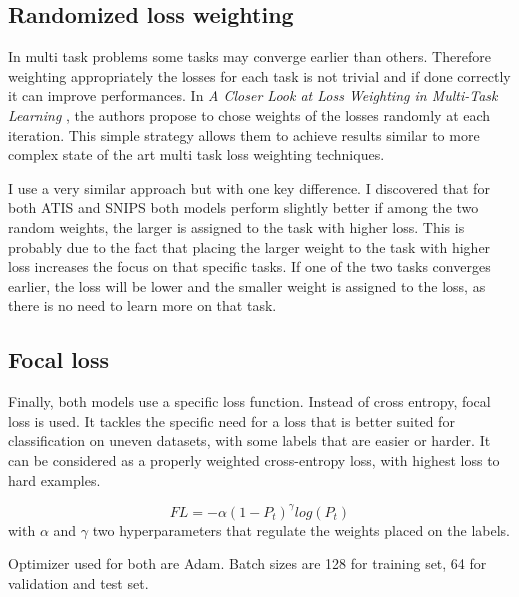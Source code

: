 \documentclass[a4paper]{article}
\begin{document}
\subsection{Randomized loss weighting}

In multi task problems some tasks may converge earlier than others. Therefore weighting appropriately the losses for each task is not trivial and if done correctly it can improve performances. In \emph{A Closer Look at Loss Weighting in Multi-Task Learning} \cite{lin2022a}, the authors propose to chose weights of the losses randomly at each iteration. This simple strategy allows them to achieve results similar to more complex state of the art multi task loss weighting techniques. 

I use a very similar approach but with one key difference. I discovered that for both ATIS and SNIPS both models perform slightly better if among the two random weights, the larger is assigned to the task with higher loss. This is probably due to the fact that placing the larger weight to the task with higher loss increases the focus on that specific tasks. If one of the two tasks converges earlier, the loss will be lower and the smaller weight is assigned to the loss, as there is no need to learn more on that task. 

\subsection{Focal loss}
Finally, both models use a specific loss function. Instead of cross entropy, focal loss is used. It tackles the specific need for a loss that is better suited for classification on uneven datasets, with some labels that are easier or harder. It can be considered as a properly weighted cross-entropy loss, with highest loss to hard examples.

\begin{equation}
 FL = -\alpha(1-P_t)^\gamma log(P_t)
\end{equation}
with $\alpha$ and $\gamma$ two hyperparameters that regulate the weights placed on the labels.  

Optimizer used for both are Adam. Batch sizes are 128 for training set, 64 for validation and test set. 

% 
\end{document}

